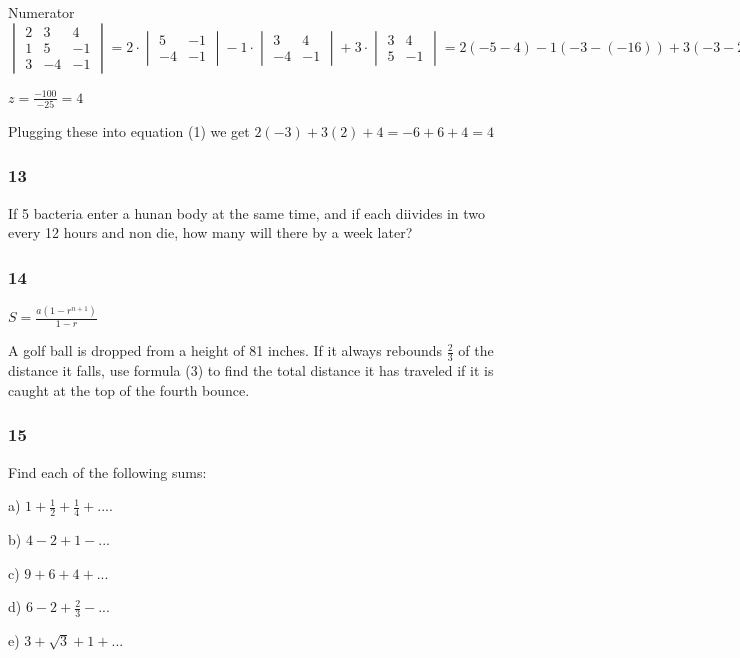 \documentclass[]{report}
\begin{document}
Numerator
$	\begin{vmatrix}
2 & 3 & 4\\
1 & 5 & -1 \\
3 & -4 & -1
\end{vmatrix} = 2 \cdot \begin{vmatrix}
5 & -1 \\
-4 & -1
\end{vmatrix}
-1 \cdot \begin{vmatrix}
3 & 4 \\
-4 & -1
\end{vmatrix}
+ 3 \cdot \begin{vmatrix}
3 & 4 \\
5 & -1
\end{vmatrix}
= 2 (-5 - 4) - 1(-3 - (-16)) + 3(-3 - 20) = 2(-9) - (13) + 3(-23) = -18 - 13 - 69 = -100
$

$z = \frac{-100}{-25} = 4$


Plugging these into equation (1) we get
$2(-3) + 3(2) + 4 = -6 + 6 + 4 = 4$


\subsubsection{13}

If 5 bacteria enter a hunan body at the same time, and if each diivides in two every 12 hours and non die, how many will there by a week later?

\subsubsection{14}

$S = \frac{a(1 - r^{n+1})}{1-r}$

A golf ball is dropped from a height of 81 inches. If it always rebounds $\frac{2}{3}$ of the distance it falls, use formula (3) to find the total distance it has traveled if it is caught at the top of the fourth bounce.

\subsubsection{15}
Find each of the following sums:

a) $1 + \frac{1}{2} + \frac{1}{4} + ....$

b) $ 4 - 2 + 1 - ...$

c) $9 + 6 + 4 + ...$

d) $6 - 2 + \frac{2}{3} - ... $

e) $3 + \sqrt{3} + 1 + ... $
\end{document}
